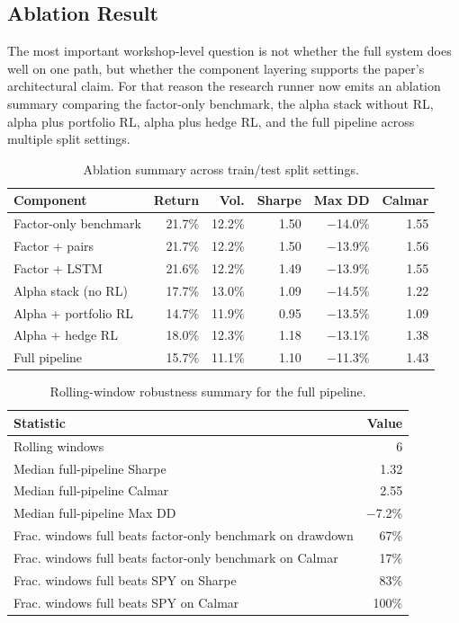 \documentclass[10pt,twocolumn]{article}
\begin{document}
\subsection{Ablation Result}

The most important workshop-level question is not whether the full system does
well on one path, but whether the component layering supports the paper's
architectural claim. For that reason the research runner now emits an ablation
summary comparing the factor-only benchmark, the alpha stack without RL, alpha
plus portfolio RL, alpha plus hedge RL, and the full pipeline across multiple
split settings.

\begin{table}[t]
\centering
\caption{Ablation summary across train/test split settings.}
\label{tab:ablation_summary}
\begingroup\small
\begin{tabular}{@{} l r r r r r @{}}
\toprule
\textbf{Component} & \textbf{Return} & \textbf{Vol.} & \textbf{Sharpe} & \textbf{Max DD} & \textbf{Calmar} \\
\midrule
Factor-only benchmark & 21.7\% & 12.2\% & 1.50 & $-$14.0\% & 1.55 \\
Factor + pairs        & 21.7\% & 12.2\% & 1.50 & $-$13.9\% & 1.56 \\
Factor + LSTM         & 21.6\% & 12.2\% & 1.49 & $-$13.9\% & 1.55 \\
Alpha stack (no RL)   & 17.7\% & 13.0\% & 1.09 & $-$14.5\% & 1.22 \\
Alpha + portfolio RL  & 14.7\% & 11.9\% & 0.95 & $-$13.5\% & 1.09 \\
Alpha + hedge RL      & 18.0\% & 12.3\% & 1.18 & $-$13.1\% & 1.38 \\
Full pipeline         & 15.7\% & 11.1\% & 1.10 & $-$11.3\% & 1.43 \\
\bottomrule
\end{tabular}
\endgroup
\end{table}

\begin{table}[t]
\centering
\caption{Rolling-window robustness summary for the full pipeline.}
\label{tab:robustness_summary}
\begin{tabular}{@{} l r @{}}
\toprule
\textbf{Statistic} & \textbf{Value} \\
\midrule
Rolling windows                                    & 6 \\
Median full-pipeline Sharpe                        & 1.32 \\
Median full-pipeline Calmar                        & 2.55 \\
Median full-pipeline Max DD                        & $-$7.2\% \\
Frac. windows full beats factor-only benchmark on drawdown & 67\% \\
Frac. windows full beats factor-only benchmark on Calmar   & 17\% \\
Frac. windows full beats SPY on Sharpe             & 83\% \\
Frac. windows full beats SPY on Calmar             & 100\% \\
\bottomrule
\end{tabular}
\end{table}
\end{document}
